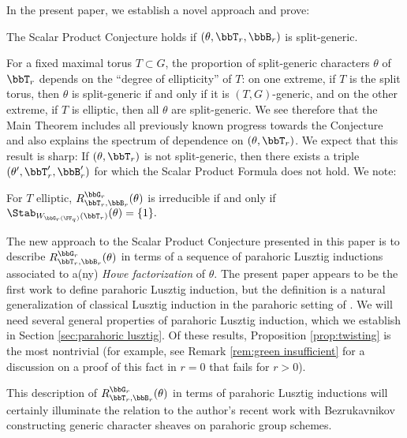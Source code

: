 In the present paper, we establish a novel approach and prove:

\begin{maintheorem}\label{thm:scalar product}
  The Scalar Product Conjecture holds if $(\theta,\bbT_r,\bbB_r)$ is split-generic.
\end{maintheorem}

For a fixed maximal torus $T \subset G$, the proportion of split-generic characters $\theta$ of $\bbT_r$ depends on the ``degree of ellipticity'' of $T$: on one extreme, if $T$ is the split torus, then $\theta$ is split-generic if and only if it is $(T,G)$-generic, and on the other extreme, if $T$ is elliptic, then all $\theta$ are split-generic. We see therefore that the Main Theorem includes all previously known progress towards the Conjecture and also explains  the spectrum of dependence on $(\theta,\bbT_r)$. We expect that this result is sharp: If $(\theta,\bbT_r)$ is not split-generic, then there exists a triple $(\theta',\bbT_r',\bbB_r')$ for which the Scalar Product Formula does not hold. We note: 
\begin{displaycorollary}
  For $T$ elliptic, $R_{\bbT_r,\bbB_r}^{\bbG_r}(\theta)$ is 
  irreducible if and only if $\Stab_{W_{\bbG_r(\FF_q)}(\bbT_r)}(\theta) = \{1\}.$
\end{displaycorollary}

The new approach to the Scalar Product Conjecture presented in this paper is to describe $R_{\bbT_r,\bbB_r}^{\bbG_r}(\theta)$ in terms of a sequence of parahoric Lusztig inductions associated to a(ny) \textit{Howe factorization} of $\theta$. The present paper appears to be the first work to define parahoric Lusztig induction, but the definition is a natural generalization of classical Lusztig induction \cite{Lus76} in the parahoric setting of \cite{CI21-RT}. We will need several general properties of parahoric Lusztig induction, which we establish in Section \ref{sec:parahoric lusztig}. Of these results, Proposition \ref{prop:twisting} is the most nontrivial (for example, see Remark \ref{rem:green insufficient} for a discussion on a proof of this fact in $r=0$ that fails for $r>0$).

This description of $R_{\bbT_r,\bbB_r}^{\bbG_r}(\theta)$ in terms of parahoric Lusztig inductions will certainly illuminate the relation to the author's recent work with Bezrukavnikov \cite{BC24} constructing generic character sheaves on parahoric group schemes.



